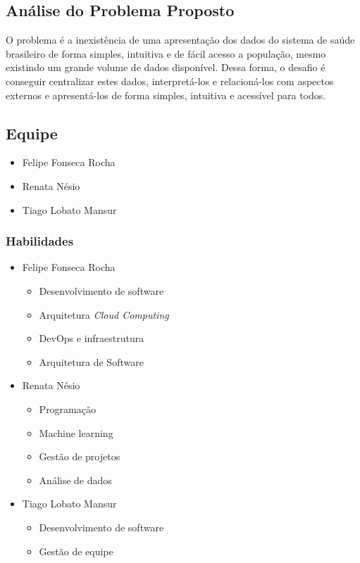\documentclass[journal]{IEEEtran}
\begin{document}
\subsection{Análise do Problema Proposto}
O problema é a inexistência de uma apresentação dos dados do sistema de saúde brasileiro de forma simples, intuitiva e de fácil acesso a população, mesmo existindo um grande volume de dados disponível. Dessa forma, o desafio é conseguir centralizar estes dados, interpretá-los e relacioná-los com aspectos externos e apresentá-los de forma simples, intuitiva e acessível para todos. 
\subsection{Equipe}
\begin{itemize}
    \item Felipe Fonseca Rocha
    \item Renata Nésio
    \item Tiago Lobato Mansur
\end{itemize}

\subsubsection{Habilidades}
\begin{itemize}
   \item Felipe Fonseca Rocha
   \begin{itemize}
     \item Desenvolvimento de software
     \item Arquitetura \textit{Cloud Computing}
     \item DevOps e infraestrutura
     \item Arquitetura de Software
   \end{itemize}

    \item Renata Nésio
   \begin{itemize}
     \item Programação
     \item Machine learning 
     \item Gestão de projetos
     \item Análise de dados
   \end{itemize}

   \item Tiago Lobato Mansur
   \begin{itemize}
     \item Desenvolvimento de software
     \item Gestão de equipe
   \end{itemize}

\end{itemize}
\end{document}
